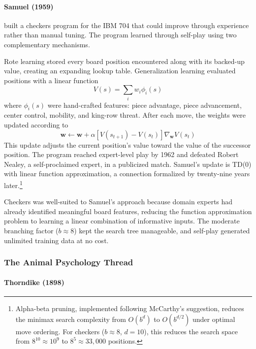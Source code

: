\paragraph{Samuel (1959)}

\citet{Samuel1959} built a checkers program for the IBM 704 that could improve through experience rather than manual tuning. The program learned through self-play using two complementary mechanisms.

Rote learning stored every board position encountered along with its backed-up value, creating an expanding lookup table. Generalization learning evaluated positions with a linear function
\begin{equation}
V(s) = \sum_{i} w_i \phi_i(s)
\end{equation}
where $\phi_i(s)$ were hand-crafted features: piece advantage, piece advancement, center control, mobility, and king-row threat. After each move, the weights were updated according to
\begin{equation}
\mathbf{w} \leftarrow \mathbf{w} + \alpha \left[ V(s_{t+1}) - V(s_t) \right] \nabla_{\mathbf{w}} V(s_t)
\end{equation}
This update adjusts the current position's value toward the value of the successor position. The program reached expert-level play by 1962 and defeated Robert Nealey, a self-proclaimed expert, in a publicized match. Samuel's update is TD(0) with linear function approximation, a connection formalized by \citet{sutton1988} twenty-nine years later.\footnote{Alpha-beta pruning, implemented following McCarthy's suggestion, reduces the minimax search complexity from $O(b^d)$ to $O(b^{d/2})$ under optimal move ordering. For checkers ($b \approx 8$, $d = 10$), this reduces the search space from $8^{10} \approx 10^9$ to $8^5 \approx 33{,}000$ positions.}

Checkers was well-suited to Samuel's approach because domain experts had already identified meaningful board features, reducing the function approximation problem to learning a linear combination of informative inputs. The moderate branching factor ($b \approx 8$) kept the search tree manageable, and self-play generated unlimited training data at no cost.


\subsubsection{The Animal Psychology Thread}

\paragraph{Thorndike (1898)}

